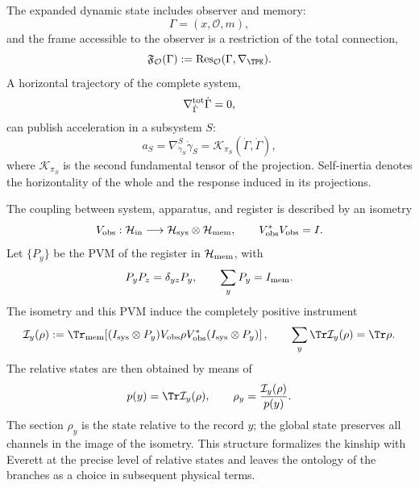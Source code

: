 The expanded dynamic state includes observer and memory:
\begin{equation}
 \Gamma=(x,\mathcal O,m),
 \label{eq:descendant-observer-state}
\end{equation}
and the frame accessible to the observer is a restriction of the total connection,
\begin{equation}
 \mathfrak F_{\mathcal O}(\Gamma)
 :=\operatorname{Res}_{\mathcal O}
 (\Gamma,\nabla_{\TPK}).
 \label{eq:descendant-observer-frame}
\end{equation}
A horizontal trajectory of the complete system,
\begin{equation}
 \nabla^{\rm tot}_{\dot\Gamma}\dot\Gamma=0,
 \label{eq:descendant-total-horizontal}
\end{equation}
can publish acceleration in a subsystem \(S\):
\begin{equation}
 a_S=\nabla^S_{\dot\gamma_S}\dot\gamma_S
 =\mathcal K_{\pi_S}(\dot\Gamma,\dot\Gamma),
 \label{eq:descendant-projected-acceleration}
\end{equation}
where \(\mathcal K_{\pi_S}\) is the second fundamental tensor of the
projection. Self-inertia denotes the horizontality of the whole and the
response induced in its projections.

The coupling between system, apparatus, and register is described by an
isometry
\begin{equation}
 V_{\rm obs}:\mathcal H_{\rm in}\longrightarrow
 \mathcal H_{\rm sys}\otimes\mathcal H_{\rm mem},
 \qquad
 V_{\rm obs}^*V_{\rm obs}=I.
 \label{eq:descendant-observer-isometry}
\end{equation}
Let \(\{P_y\}\) be the PVM of the register in \(\mathcal H_{\rm mem}\), with
\begin{equation}
 P_yP_z=\delta_{yz}P_y,
 \qquad
 \sum_yP_y=I_{\rm mem}.
 \label{eq:descendant-observer-PVM}
\end{equation}
The isometry and this PVM induce the completely positive instrument
\begin{equation}
 \mathcal I_y(\rho)
 :=\Tr_{\rm mem}\!\left[
 (I_{\rm sys}\otimes P_y)V_{\rm obs}\rho V_{\rm obs}^*
 (I_{\rm sys}\otimes P_y)
 \right],
 \qquad
 \sum_y\Tr\mathcal I_y(\rho)=\Tr\rho.
 \label{eq:descendant-observer-instrument}
\end{equation}
The relative states are then obtained by means of
\begin{equation}
 p(y)=\Tr\mathcal I_y(\rho),
 \qquad
 \rho_y=\frac{\mathcal I_y(\rho)}{p(y)}.
 \label{eq:descendant-relative-state}
\end{equation}
The section \(\rho_y\) is the state relative to the record \(y\); the global state
preserves all channels in the image of the isometry. This
structure formalizes the kinship with Everett at the precise level of
relative states and leaves the ontology of the branches as a choice in subsequent physical terms.

